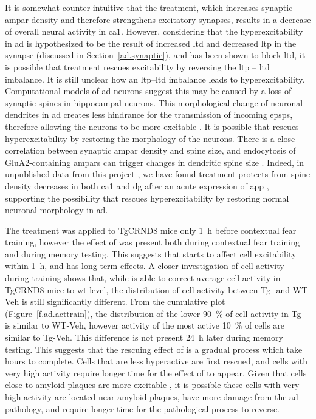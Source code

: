 It is somewhat counter-intuitive that the \tglu{} treatment, which increases synaptic \gls{ampar} density and therefore strengthens excitatory synapses, results in a decrease of overall neural activity in \gls{ca1}. However, considering that the hyperexcitability in \gls{ad} is hypothesized to be the result of increased \gls{ltd} and decreased \gls{ltp} in the synapse (discussed in Section~\ref{ad.synaptic}), and \tglu{} has been shown to block \gls{ltd}, it is possible that \tglu{} treatment rescues excitability by reversing the \gls{ltp} -- \gls{ltd} imbalance. It is still unclear how an \gls{ltp}--\gls{ltd} imbalance leads to hyperexcitability. Computational models of \gls{ad} neurons suggest this may be caused by a loss of synaptic spines in hippocampal neurons. This morphological change of neuronal dendrites in \gls{ad} creates less hindrance for the transmission of incoming \glspl{epsp}, therefore allowing the neurons to be more excitable \citep{siskova14}. It is possible that \tglu{} rescues hyperexcitability by restoring the morphology of the neurons. There is a close correlation between synaptic \gls{ampar} density and spine size, and endocytosis of GluA2-containing \glspl{ampar} can trigger changes in dendritic spine size \citep{hanley08}. Indeed, in unpublished data from this project , we have found \tglu{} treatment protects from spine density decreases in both \gls{ca1} and \gls{dg} after an acute expression of \gls{app} , supporting the possibility that \tglu{} rescues hyperexcitability by restoring normal neuronal morphology in \gls{ad}. 

The \tglu{} treatment was applied to TgCRND8 mice only \SI{1}{\hour} before contextual fear training, however the effect of \tglu{} was present both during contextual fear training and during memory testing. This suggests that \tglu{} starts to affect cell excitability within \SI{1}{\hour}, and has long-term effects. A closer investigation of cell activity during training shows that, while \tglu{} is able to correct average cell activity in TgCRND8 mice to \gls{wt} level, the distribution of cell activity between Tg-\tglu{} and WT-Veh is still significantly different. From the cumulative plot (Figure~\ref{f.ad.acttrain}), the distribution of the lower \SI{90}{\percent} of cell activity in Tg-\tglu{} is similar to WT-Veh, however activity of the most active \SI{10}{\percent} of cells are similar to Tg-Veh. This difference is not present \SI{24}{\hour} later during memory testing. This suggests that the rescuing effect of \tglu{} is a gradual process which take hours to complete. Cells that are less hyperactive are first rescued, and cells with very high activity require longer time for the effect of \tglu{} to appear. Given that cells close to amyloid plaques are more excitable \citep{busche12}, it is possible these cells with very high activity are located near amyloid plaques, have more damage from the \gls{ad} pathology, and require longer time for the pathological process to reverse. 


